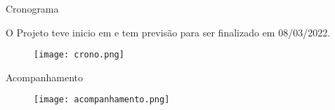 \begin{frame}[c]{Cronograma}

    O Projeto teve inicio em  e tem previsão para ser finalizado em {08/03/2022}.
    
    
    \begin{center}
        \begin{figure}
            \texttt{[image: crono.png]}
            
        \end{figure}
        
    \end{center}




\end{frame}


\begin{frame}[c]{Acompanhamento}

    \begin{center}
        \begin{figure}
            \texttt{[image: acompanhamento.png]}
            
        \end{figure}
        
    \end{center}


\end{frame}
